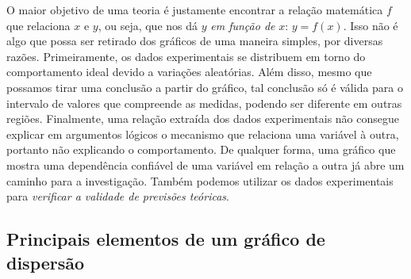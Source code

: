 O maior objetivo de uma teoria é justamente encontrar a relação matemática $f$ que relaciona $x$ e $y$, ou seja, que nos dá $y$ \emph{em função de} $x$: $y = f(x)$. Isso não é algo que possa ser retirado dos gráficos de uma maneira simples, por diversas razões. Primeiramente, os dados experimentais se distribuem em torno do comportamento ideal devido a variações aleatórias. Além disso, mesmo que possamos tirar uma conclusão a partir do gráfico, tal conclusão só é válida para o intervalo de valores que compreende as medidas, podendo ser diferente em outras regiões. Finalmente, uma relação extraída dos dados experimentais não consegue explicar em argumentos lógicos o mecanismo que relaciona uma variável à outra, portanto não explicando o comportamento. De qualquer forma, uma gráfico que mostra uma dependência confiável de uma variável em relação a outra já abre um caminho para a investigação. Também podemos utilizar os dados experimentais para \emph{verificar a validade de previsões teóricas}.

\subsection{Principais elementos de um gráfico de dispersão}

